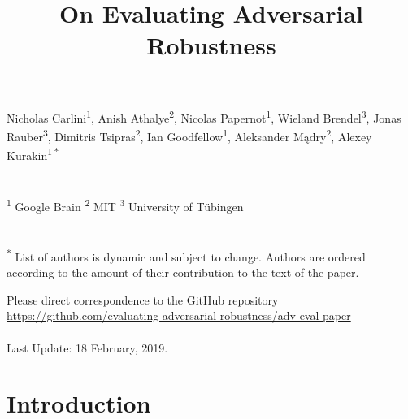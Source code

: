 \documentclass{article} %
\begin{document}
\title{\vspace{5em}On Evaluating Adversarial Robustness}
\thispagestyle{empty}
\maketitle

  Nicholas Carlini\textsuperscript{1},
  Anish Athalye\textsuperscript{2},
  Nicolas Papernot\textsuperscript{1},
  Wieland Brendel\textsuperscript{3},
  Jonas Rauber\textsuperscript{3},
  Dimitris Tsipras\textsuperscript{2},
  Ian Goodfellow\textsuperscript{1},
  Aleksander M\k{a}dry\textsuperscript{2},
  Alexey Kurakin\textsuperscript{1}\,\textsuperscript{*}
  \\
  \noindent \\
  \noindent \\
  \textsuperscript{1} Google Brain
  \textsuperscript{2} MIT 
  \textsuperscript{3} University of T\"ubingen
  \\
  \noindent \\
  \noindent \\
  \textsuperscript{*} List of authors is dynamic and subject to change.
  Authors are ordered according to the amount of their contribution
  to the text of the paper.


\vspace{20em}
Please direct correspondence to the GitHub repository \\
\url{https://github.com/evaluating-adversarial-robustness/adv-eval-paper} \\
\noindent \\
Last Update: 18 February, 2019. \\ %
\newpage

\reversemarginpar

  \vspace{-1em}
\begin{abstract}
    
\end{abstract}


\section{Introduction}
\end{document}
